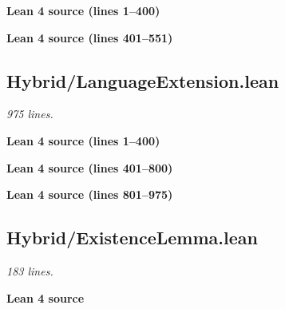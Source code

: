 \documentclass[11pt,a4paper]{article}
\renewcommand{\_}{\origtextunderscore\allowbreak}
\begin{document}
\noindent\textcolor{green!40!black}{\textbf{Lean 4 source (lines 1--400)}}\par\vspace{0.25\baselineskip}


\noindent\textcolor{green!40!black}{\textbf{Lean 4 source (lines 401--551)}}\par\vspace{0.25\baselineskip}


\hypertarget{hybridlanguageextension.lean}{%
\subsection{Hybrid/LanguageExtension.lean}\label{hybridlanguageextension.lean}}

\emph{975 lines.}

\noindent\textcolor{green!40!black}{\textbf{Lean 4 source (lines 1--400)}}\par\vspace{0.25\baselineskip}


\noindent\textcolor{green!40!black}{\textbf{Lean 4 source (lines 401--800)}}\par\vspace{0.25\baselineskip}


\noindent\textcolor{green!40!black}{\textbf{Lean 4 source (lines 801--975)}}\par\vspace{0.25\baselineskip}


\hypertarget{hybridexistencelemma.lean}{%
\subsection{Hybrid/ExistenceLemma.lean}\label{hybridexistencelemma.lean}}

\emph{183 lines.}

\vspace{0.5\baselineskip}
\noindent\textcolor{green!40!black}{\textbf{Lean 4 source}}\par\vspace{0.25\baselineskip}

\vspace{0.5\baselineskip}
\end{document}
